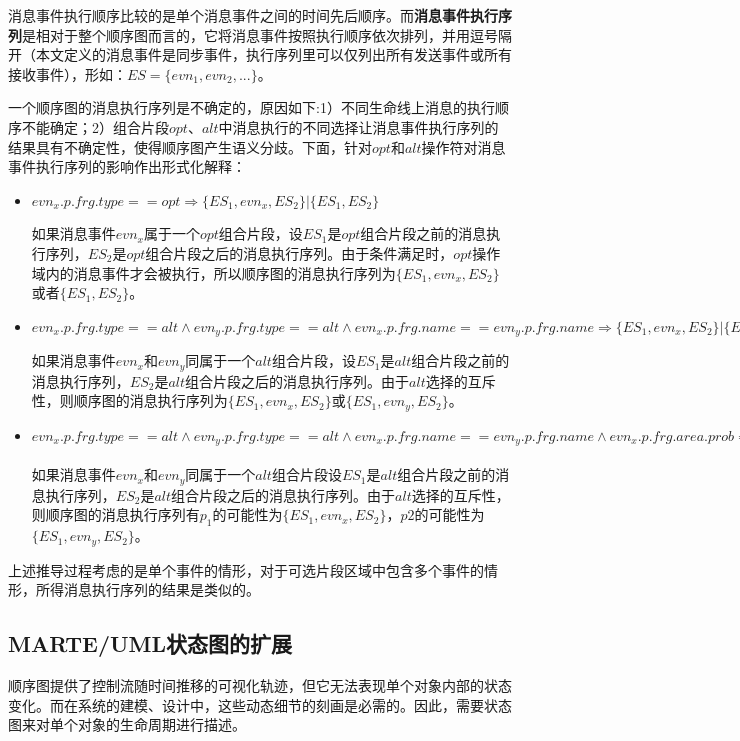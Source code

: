 	消息事件执行顺序比较的是单个消息事件之间的时间先后顺序。而\textbf{消息事件执行序列}是相对于整个顺序图而言的，它将消息事件按照执行顺序依次排列，并用逗号隔开（本文定义的消息事件是同步事件，执行序列里可以仅列出所有发送事件或所有接收事件），形如：$ES=\{evn_{1},evn_{2},... \}$。

	一个顺序图的消息执行序列是不确定的，原因如下:1）不同生命线上消息的执行顺序不能确定；2）组合片段$opt$、$alt$中消息执行的不同选择让消息事件执行序列的结果具有不确定性，使得顺序图产生语义分歧。下面，针对$opt$和$alt$操作符对消息事件执行序列的影响作出形式化解释：
	
	\begin{itemize}
	\item $evn_{x}.p.frg.type==opt \Longrightarrow  \{ ES_{1},evn_{x},ES_{2} \} | \{ ES_{1},ES_{2} \} $
	
	如果消息事件$evn_{x}$属于一个$opt$组合片段，设$ES_{1}$是$opt$组合片段之前的消息执行序列，$ES_{2}$是$opt$组合片段之后的消息执行序列。由于条件满足时，$opt$操作域内的消息事件才会被执行，所以顺序图的消息执行序列为$\{ ES_{1},evn_{x},ES_{2} \} $或者$\{ ES_{1},ES_{2} \}$。
	\item $evn_{x}.p.frg.type==alt \wedge evn_{y}.p.frg.type==alt \wedge evn_{x}.p.frg.name==evn_{y}.p.frg.name \Longrightarrow \{ ES_{1},evn_{x},ES_{2} \} | \{ ES_{1},evn_{y},ES_{2} \}$
	
	如果消息事件$evn_{x}$和$evn_{y}$同属于一个$alt$组合片段，设$ES_{1}$是$alt$组合片段之前的消息执行序列，$ES_{2}$是$alt$组合片段之后的消息执行序列。由于$alt$选择的互斥性，则顺序图的消息执行序列为$\{ ES_{1},evn_{x},ES_{2} \}$或$\{ ES_{1},evn_{y},ES_{2} \}$。
	\item $evn_{x}.p.frg.type==alt \wedge evn_{y}.p.frg.type==alt \wedge evn_{x}.p.frg.name==evn_{y}.p.frg.name \wedge evn_{x}.p.frg.area.prob==p_{1} \wedge evn_{y}.p.frg.area.prob==p_{2} \Longrightarrow \{ ES_{1},evn_{x},ES_{2} \}_{p_{1}} | \{ ES_{1},evn_{y},ES_{2}\}_{p_{2}} $
	
	如果消息事件$evn_{x}$和$evn_{y}$同属于一个$alt$组合片段设$ES_{1}$是$alt$组合片段之前的消息执行序列，$ES_{2}$是$alt$组合片段之后的消息执行序列。由于$alt$选择的互斥性，则顺序图的消息执行序列有$p_{1}$的可能性为$\{ ES_{1},evn_{x},ES_{2} \}$，$p2$的可能性为$\{ ES_{1},evn_{y},ES_{2} \}$。
	\end{itemize}
	上述推导过程考虑的是单个事件的情形，对于可选片段区域中包含多个事件的情形，所得消息执行序列的结果是类似的。
	
\subsection{MARTE/UML状态图的扩展}
\label{2.3.3}
	顺序图提供了控制流随时间推移的可视化轨迹，但它无法表现单个对象内部的状态变化。而在系统的建模、设计中，这些动态细节的刻画是必需的。因此，需要状态图来对单个对象的生命周期进行描述。
	
